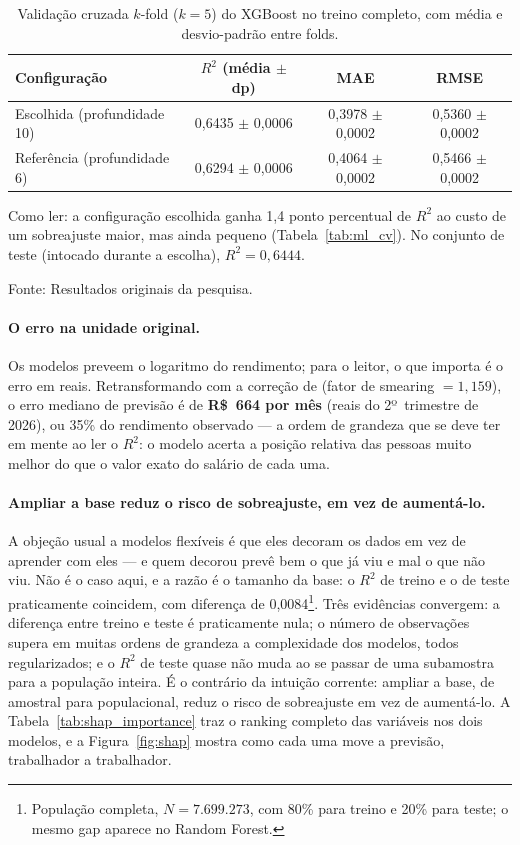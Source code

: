 \documentclass[11pt, a4paper, oneside]{article}
\begin{document}
\begin{table}[!ht]
\centering
\caption{Validação cruzada $k$-{fold} ($k=5$) do XGBoost no treino completo,
com média e desvio-padrão entre {folds}.}
\label{tab:ml_cv_b}
\small
\begin{tabular}{lccc}
\toprule
Configuração & $R^2$ (média $\pm$ dp) & MAE & RMSE \\
\midrule
Escolhida (profundidade 10) & 0,6435 $\pm$ 0,0006 & 0,3978 $\pm$ 0,0002 & 0,5360 $\pm$ 0,0002 \\
Referência (profundidade 6) & 0,6294 $\pm$ 0,0006 & 0,4064 $\pm$ 0,0002 & 0,5466 $\pm$ 0,0002 \\
\bottomrule
\end{tabular}
\normalsize
\par\smallskip
\footnotesize{Como ler:} a configuração escolhida ganha 1,4 ponto percentual
de $R^2$ ao custo de um sobreajuste maior, mas ainda pequeno (Tabela~\ref{tab:ml_cv}). No
conjunto de teste (intocado durante a escolha), $R^2 = 0,6444$.
\par\smallskip\footnotesize Fonte: Resultados originais da pesquisa.
\end{table}


\paragraph{O erro na unidade original.} Os modelos preveem o {logaritmo} do
rendimento; para o leitor, o que importa é o erro em reais. Retransformando com a correção
de  (fator de {smearing} $= 1,159$), o erro mediano de
previsão é de \textbf{R\$~664 por mês} (reais do 2º~trimestre de 2026), ou 35\% do rendimento
observado --- a ordem de grandeza que se deve ter em mente ao ler o $R^2$: o modelo acerta
a posição relativa das pessoas muito melhor do que o valor exato do salário de cada uma.

\paragraph{Ampliar a base reduz o risco de sobreajuste, em vez de aumentá-lo.}
A objeção usual a modelos flexíveis é que eles decoram os dados em vez de aprender com
eles --- e quem decorou prevê bem o que já viu e mal o que não viu. Não é o caso aqui, e
a razão é o tamanho da base: o $R^2$ de treino e o de teste praticamente coincidem, com
diferença de 0,0084\footnote{População completa, $N=7.699.273$, com 80\% para
treino e 20\% para teste; o mesmo {gap} aparece no Random Forest.}. Três evidências
convergem: a diferença entre treino e teste é praticamente nula; o número de observações
supera em muitas ordens de grandeza a complexidade dos modelos, todos regularizados; e o
$R^2$ de teste quase não muda ao se passar de uma subamostra para a população inteira. É
o contrário da intuição corrente: ampliar a base, de amostral para populacional, reduz o
risco de sobreajuste em vez de aumentá-lo. A Tabela~\ref{tab:shap_importance} traz o ranking completo das variáveis nos dois modelos, e a Figura~\ref{fig:shap} mostra como cada uma move a previsão, trabalhador a trabalhador.
\end{document}
